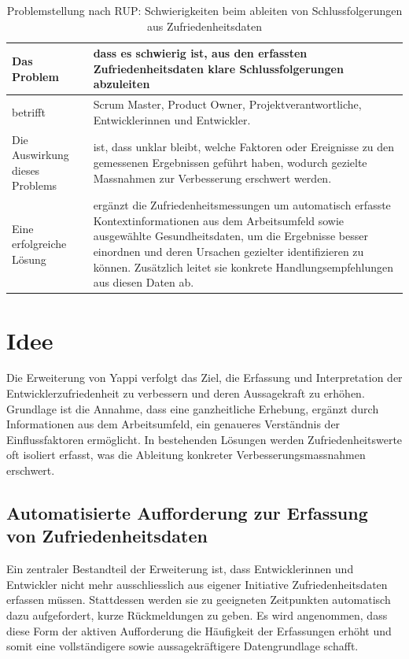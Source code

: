 \documentclass[12pt,a4paper]{report}
\begin{document}
\begin{table}[H]
  \caption{Problemstellung nach RUP: Schwierigkeiten beim ableiten von Schlussfolgerungen aus Zufriedenheitsdaten}
  \label{tab:rup-conclusions}
  \centering
  \begin{tabularx}{\textwidth}{>{\raggedright\arraybackslash}p{}|X}
    \hline
    Das Problem & dass es schwierig ist, aus den erfassten Zufriedenheitsdaten klare Schlussfolgerungen abzuleiten \\ \hline

    betrifft & Scrum Master, Product Owner, Projektverantwortliche, Entwicklerinnen und Entwickler. \\ \hline

    Die Auswirkung dieses Problems & ist, dass unklar bleibt, welche Faktoren oder Ereignisse zu den gemessenen Ergebnissen 
    geführt haben, wodurch gezielte Massnahmen zur Verbesserung erschwert werden. \\ \hline

    Eine erfolgreiche Lösung & ergänzt die Zufriedenheitsmessungen um automatisch erfasste Kontextinformationen aus dem 
    Arbeitsumfeld sowie ausgewählte Gesundheitsdaten, um die Ergebnisse besser einordnen und deren Ursachen gezielter 
    identifizieren zu können. Zusätzlich leitet sie konkrete Handlungsempfehlungen aus diesen Daten ab. \\ \hline
  \end{tabularx}
\end{table}

\section{Idee}

Die Erweiterung von Yappi verfolgt das Ziel, die Erfassung und Interpretation der Entwicklerzufriedenheit zu verbessern und deren
Aussagekraft zu erhöhen. Grundlage ist die Annahme, dass eine ganzheitliche Erhebung, ergänzt durch Informationen aus dem
Arbeitsumfeld, ein genaueres Verständnis der Einflussfaktoren ermöglicht. In bestehenden Lösungen werden Zufriedenheitswerte oft
isoliert erfasst, was die Ableitung konkreter Verbesserungsmassnahmen erschwert.

\subsection{Automatisierte Aufforderung zur Erfassung von Zufriedenheitsdaten}

Ein zentraler Bestandteil der Erweiterung ist, dass Entwicklerinnen und Entwickler nicht mehr ausschliesslich aus eigener
Initiative Zufriedenheitsdaten erfassen müssen. Stattdessen werden sie zu geeigneten Zeitpunkten automatisch dazu aufgefordert,
kurze Rückmeldungen zu geben. Es wird angenommen, dass diese Form der aktiven Aufforderung die Häufigkeit der Erfassungen erhöht
und somit eine vollständigere sowie aussagekräftigere Datengrundlage schafft.
\end{document}

